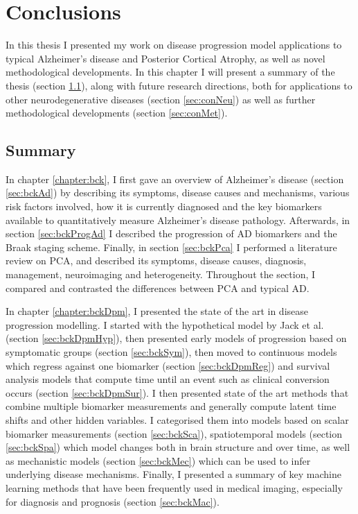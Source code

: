 \chapter{Conclusions}
\label{chapter:conclusions}

\newcommand{\hl}[1]{\textcolor{black}{#1}}



In this thesis I presented my work on disease progression model applications to typical Alzheimer's disease and Posterior Cortical Atrophy, as well as novel methodological developments. In this chapter I will present a summary of the thesis (section \ref{sec:conSum}), along with future research directions, both for applications to other neurodegenerative diseases (section \ref{sec:conNeu}) as well as further methodological developments (section \ref{sec:conMet}). 

\section{Summary}
\label{sec:conSum}

In chapter \ref{chapter:bck}, I first gave an overview of Alzheimer's disease (section \ref{sec:bckAd}) by describing its symptoms, disease causes and mechanisms, various risk factors involved, how it is currently diagnosed and the key biomarkers available to quantitatively measure Alzheimer's disease pathology. Afterwards, in section \ref{sec:bckProgAd} I described the progression of AD biomarkers and the Braak staging scheme. Finally, in section \ref{sec:bckPca} I performed a literature review on PCA, and described its symptoms, disease causes, diagnosis, management, neuroimaging and heterogeneity. Throughout the section, I compared and contrasted the differences between PCA and typical AD.

In chapter \ref{chapter:bckDpm}, I presented the state of the art in disease progression modelling. I started with the hypothetical model by Jack et al. \cite{jack2010hypothetical} (section \ref{sec:bckDpmHyp}), then presented early models of progression based on symptomatic groups (section \ref{sec:bckSym}), then moved to continuous models which regress against one biomarker (section \ref{sec:bckDpmReg}) and survival analysis models that compute time until an event such as clinical conversion occurs (section \ref{sec:bckDpmSur}). I then presented state of the art methods that combine multiple biomarker measurements and generally compute latent time shifts and other hidden variables. I categorised them into models based on scalar biomarker measurements (section \ref{sec:bckSca}), spatiotemporal models (section \ref{sec:bckSpa}) which model changes both in brain structure and over time, as well as mechanistic models (section \ref{sec:bckMec}) which can be used to infer underlying disease mechanisms. Finally, I presented a summary of key machine learning methods that have been frequently used in medical imaging, especially for diagnosis and prognosis (section \ref{sec:bckMac}). 

